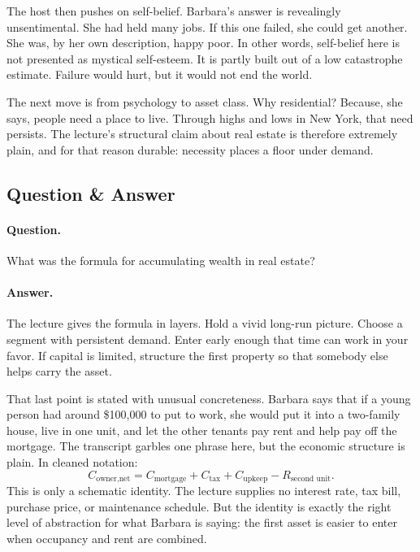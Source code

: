 The host then pushes on self-belief. Barbara's answer is revealingly unsentimental. She had held many jobs. If this one failed, she could get another. She was, by her own description, happy poor. In other words, self-belief here is not presented as mystical self-esteem. It is partly built out of a low catastrophe estimate. Failure would hurt, but it would not end the world.

The next move is from psychology to asset class. Why residential? Because, she says, people need a place to live. Through highs and lows in New York, that need persists. The lecture's structural claim about real estate is therefore extremely plain, and for that reason durable: necessity places a floor under demand.

\subsection{Question \& Answer}

\paragraph{Question.} What was the formula for accumulating wealth in real estate?

\paragraph{Answer.} The lecture gives the formula in layers. Hold a vivid long-run picture. Choose a segment with persistent demand. Enter early enough that time can work in your favor. If capital is limited, structure the first property so that somebody else helps carry the asset.

That last point is stated with unusual concreteness. Barbara says that if a young person had around \$100{,}000 to put to work, she would put it into a two-family house, live in one unit, and let the other tenants pay rent and help pay off the mortgage. The transcript garbles one phrase here, but the economic structure is plain. In cleaned notation:
\begin{equation}
C_{\text{owner,net}}
=
C_{\text{mortgage}}+C_{\text{tax}}+C_{\text{upkeep}}-R_{\text{second unit}}.
\end{equation}
This is only a schematic identity. The lecture supplies no interest rate, tax bill, purchase price, or maintenance schedule. But the identity is exactly the right level of abstraction for what Barbara is saying: the first asset is easier to enter when occupancy and rent are combined.

